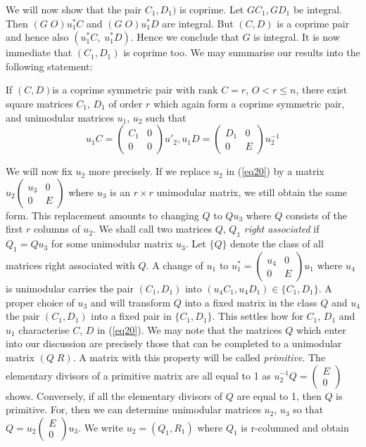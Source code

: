 We will now show that the pair $C_1, D_1)$ is coprime. Let $GC_1,
GD_1$ be integral. Then $(G \;  O) u^*_1 C$ and $(G \;  O) u^*_1 D$ are
integral. But $(C, D)$ is a coprime pair and hence also $(u^*_1 C,
\; u^*_1 D)$. Hence we conclude that $G$ is integral. It is now immediate
that $(C_1, D_1)$ is coprime too. We may summarise our results into
the following statement: 

If $(C, D)$\pageoriginale  is a coprime symmetric pair with rank $C =
r$, $O < r \le 
n$, there exist square matrices $C_1$, $D_1$ of order $r$ which again
form a coprime symmetric pair, and unimodular matrices $u_1$, $u_2$ such
that  
\begin{equation*}
u_1 C = \begin{pmatrix}C_1 & 0 \\ 0& 0 \end{pmatrix} u'_2 ,    u_1 D
= \begin{pmatrix}D_1 & 0 \\ 0 & E \end{pmatrix} u^{-1}_2 \tag{20}\label{eq20} 
\end{equation*}

We will now fix $u_2$ more precisely. If we replace $u_2$ in (\ref{eq20}) by
a matrix $u_2 \begin{pmatrix} u_3 & 0 \\ 0 & E\end{pmatrix}$ where
  $u_3$ is an $r \times r$ unimodular matrix, we still obtain the same
  form. This replacement amounts to changing $Q$ to $Q  u_3$ where
  $Q$ consists of the first $r$ columns of $u_2$. We shall call two
  matrices $Q$, $Q_1$ \textit{right associated} if $Q_1 = Qu_3$ for some
  unimodular matrix $u_3$. Let $\{ Q\}$ denote the class of all
  matrices right associated with $Q$. A change of $u_1$ to $u_1^*
  = \begin{pmatrix}u_4 & 0 \\ 0 & E  \end{pmatrix}u_1$ where $u_4$ is
  unimodular carries the pair $(C_1,D_1)$ into $(u_4   C_1,u_4   D_1)
  \in \{ C_1,D_1\}$. A proper choice of $u_3$ and will transform $Q$
  into a fixed matrix in the class $Q$ and $u_4$ the pair $(C_1,D_1)$ into a
  fixed pair in $\{C_1,D_1 \}$. This settles how for $C_1$, $D_1$ and
  $u_1$ characterise $C$, $D$ in (\ref{eq20}). We may note that the matrices
  $Q$ which enter into our discussion are precisely those that can be
  completed to a unimodular matrix $(Q \; R)$. A matrix with this
  property will be called \textit{primitive}. The elementary divisors
  of a primitive matrix are all equal to 1 as $u^{-1}_2 Q
  = \begin{pmatrix}E \\ 0 \end{pmatrix}$ shows. Conversely, if all the
  elementary divisors of $Q$ are equal to 1, then $Q$ is
  primitive. For, then we can determine unimodular matrices $u_2$, $u_3$
  so that $Q = u_2\begin{pmatrix}E \\ 0 \end{pmatrix}u_3$. We write
  $u_2 = (Q_1,R_1)$ where $Q_1$ is r-columned and obtain 

